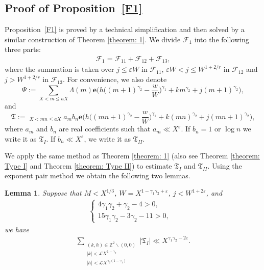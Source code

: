 \documentclass[12pt, reqno, twoside, letterpaper]{amsart}
\numberwithin{equation}{section}
\newcommand{\cF}{\ensuremath{\mathcal{F}}}
\newcommand{\cL}{\ensuremath{\mathcal{L}}}
\newcommand{\ZZ}{\ensuremath{\mathbb{Z}}}
\theoremstyle{customthm}
\newtheorem{lemma}[X]{Lemma}
\theoremstyle{customrem}
\begin{document}
\subsection{Proof of Proposition~\ref{F1}}
Proposition~\ref{F1} is proved by a technical simplification and then solved by a similar construction of Theorem \ref{theorem: 1}. We divide $\cF_1$ into the following three parts:
\begin{align*}
	\cF_1=\cF_{11}+\cF_{12}+\cF_{13},
\end{align*}
where the summation is taken over $j\leqslant \varepsilon W$ in $\cF_{11}$,
$\varepsilon W<j\leqslant W^{1+2/r}$ in $\cF_{12}$ and $j>W^{1+2/r}$
in $\cF_{13}$. For convenience, we also denote
$$
\Psi:=\sum_{X < m \leqslant aX}
\Lambda(m)\mathbf{e}\Big(h\Big((m+1)^{\gamma_2}-\frac{w}{W}\Big)^{\gamma_1}
+km^{\gamma_2}+j(m+1)^{\gamma_2}\Big),
$$
and
$$
\mathfrak{T}:=\mathop{\sum_{m\sim M}\sum_{n\sim N}}_{X < mn \leqslant aX}
a_mb_n\mathbf{e}\Big(h\Big((mn+1)^{\gamma_2}-\frac{w}{W}\Big)^{\gamma_1}
+k(mn)^{\gamma_2}+j(mn+1)^{\gamma_2}\Big),
$$
where $a_m$ and $b_n$ are real coefficients such that
$a_m\ll X^{\varepsilon}$. If $b_n=1$ or $\log n$ we write it as $\mathfrak{T}_{I}$.
If $b_n\ll X^{\varepsilon}$, we write it as $\mathfrak{T}_{II}$.

We apply the same method as Theorem \ref{theorem: 1} (also see Theorem \ref{theorem: Type I}
and Theorem \ref{theorem: Type II}) to estimate $\mathfrak{T}_{I}$ and $\mathfrak{T}_{II}$. Using
the exponent pair method we obtain the following two lemmas.

\begin{lemma}\label{lemma: Gamma I} Suppose that $M<X^{1/3}$,
$W=X^{1-\gamma_1\gamma_2+\varepsilon}$, $j<W^{1+2\varepsilon}$, and
	\begin{align}\label{eq: condition 2}
		\left\{\begin{array}{ll} 4\gamma_1\gamma_2+\gamma_2-4>0, & \\
			15\gamma_1\gamma_2-3\gamma_2-11>0, &
		\end{array}\right.
	\end{align}
	we have
	\begin{align*}
		\sum_{\substack{(k,h) \in \ZZ^2 \backslash (0,0) \\ |k|<\cL X^{1-\gamma_2} \\ |h|<\cL X^{\gamma_2(1-\gamma_1)}}}
		|\mathfrak{T}_{I}|\ll X^{\gamma_1\gamma_2-2\varepsilon}.
	\end{align*}
\end{lemma}
\end{document}
